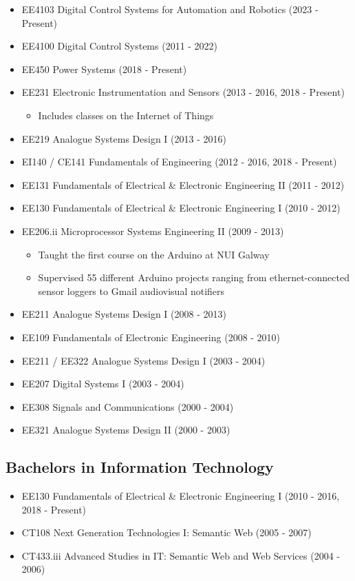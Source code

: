 \documentclass[10pt,a4paper]{res} %
\begin{document}
\begin{resume}
\begin{itemize} \itemsep -2pt
\item EE4103 Digital Control Systems for Automation and Robotics (2023 - Present)
\item EE4100 Digital Control Systems (2011 - 2022)
\item EE450 Power Systems (2018 - Present)
\item EE231 Electronic Instrumentation and Sensors (2013 - 2016, 2018 - Present)
\begin{itemize} \itemsep -2pt
\item Includes classes on the Internet of Things
\end{itemize}
\item EE219 Analogue Systems Design I (2013 - 2016)
\item EI140 / CE141 Fundamentals of Engineering (2012 - 2016, 2018 - Present)
\item EE131 Fundamentals of Electrical \& Electronic Engineering II (2011 - 2012)
\item EE130 Fundamentals of Electrical \& Electronic Engineering I (2010 - 2012)
\item EE206.ii Microprocessor Systems Engineering II (2009 - 2013)
\begin{itemize} \itemsep -2pt
\item Taught the first course on the Arduino at NUI Galway
\item Supervised 55 different Arduino projects ranging from ethernet-connected sensor loggers to Gmail audiovisual notifiers
\end{itemize}
\item EE211 Analogue Systems Design I (2008 - 2013)
\item EE109 Fundamentals of Electronic Engineering (2008 - 2010)
\item EE211 / EE322 Analogue Systems Design I (2003 - 2004)
\item EE207 Digital Systems I (2003 - 2004)
\item EE308 Signals and Communications (2000 - 2004)
\item EE321 Analogue Systems Design II (2000 - 2003)
\end{itemize}

\subsection*{Bachelors in Information Technology}

\begin{itemize} \itemsep -2pt
\item EE130 Fundamentals of Electrical \& Electronic Engineering I (2010 - 2016, 2018 - Present)
\item CT108 Next Generation Technologies I: Semantic Web (2005 - 2007)
\item CT433.iii Advanced Studies in IT: Semantic Web and Web Services (2004 - 2006)
\end{itemize}


\end{resume}
\end{document}
